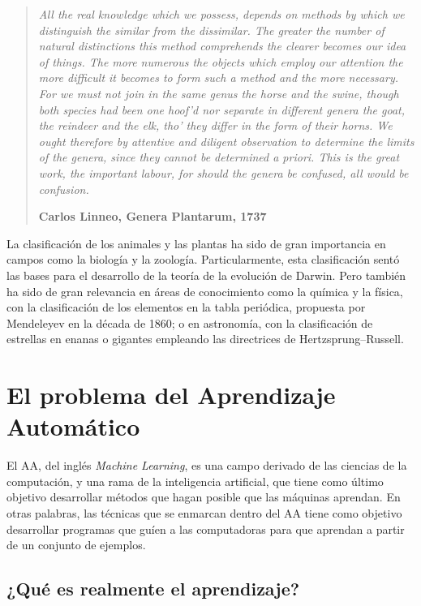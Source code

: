 \begin{quotation}{\slshape
		All the real knowledge which we possess, depends on methods by which we distinguish the similar from the dissimilar. The greater the number of natural distinctions this method comprehends the clearer becomes our idea of things. The
		more numerous the objects which employ our attention the more difficult it becomes to
		form such a method and the more necessary.
		For we must not join in the same genus the horse and the swine, though both species
		had been one hoof’d nor separate in different genera the goat, the reindeer and the elk,
		tho’ they differ in the form of their horns. We ought therefore by attentive and diligent
		observation to determine the limits of the genera, since they cannot be determined a
		priori. This is the great work, the important labour, for should the genera be confused,
		all would be confusion.} 
		\begin{flushright}
			\textbf{Carlos Linneo, Genera Plantarum, 1737}
		\end{flushright}
\end{quotation}

La clasificación de los animales y las plantas ha sido de gran importancia en campos como la biología y la zoología. Particularmente, esta clasificación sentó las bases para el desarrollo de la teoría de la evolución de Darwin. Pero también ha sido de gran relevancia en áreas de conocimiento como la química y la física, con la clasificación de los elementos en la tabla periódica, propuesta por Mendeleyev en la década de 1860; o en astronomía, con la clasificación de estrellas en enanas o gigantes empleando las directrices de Hertzsprung–Russell.

\section{El problema del Aprendizaje Automático}

El \acf{AA}, del inglés \textit{Machine Learning}, es una campo derivado de las ciencias de la computación, y una rama de la inteligencia artificial, que tiene como último objetivo desarrollar métodos que hagan posible que las máquinas aprendan. En otras palabras, las técnicas que se enmarcan dentro del \acs{AA} tiene como objetivo desarrollar programas que guíen a las computadoras para que aprendan a partir de un conjunto de ejemplos.

\subsection{¿Qué es realmente el aprendizaje?}

